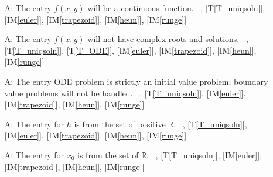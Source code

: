 \documentclass[12pt]{article}
\newcommand{\tref}[1]{T\ref{#1}}
\newcounter{assumpnum} %
\newcommand{\iref}[1]{IM\ref{#1}}
\begin{document}
\begin{itemize}
\item[A\refstepcounter{assumpnum}\theassumpnum \label{A_continuous}:]
The entry $f(x, y)$ will be a continuous function.
~\newline
[\tref{T_ODE}], [\tref{T_uniqsoln}],
[\iref{euler}], [\iref{trapezoid}], [\iref{heun}], [\iref{runge}]

\item[A\refstepcounter{assumpnum}\theassumpnum \label{A_roots}:]
The entry $f(x, y)$ will not have complex roots and solutions.
~\newline
[\tref{T_ODE}], [\tref{T_uniqsoln}],
[\tref{T_ODE}], [\iref{euler}], [\iref{trapezoid}], [\iref{heun}], [\iref{runge}]

\item[A\refstepcounter{assumpnum}\theassumpnum \label{A_boundary}:]
The entry ODE problem is strictly an initial value problem; boundary value problems will
not be handled.
~\newline
[\tref{T_ODE}], [\tref{T_uniqsoln}],
[\iref{euler}], [\iref{trapezoid}], [\iref{heun}], [\iref{runge}]




\item[A\refstepcounter{assumpnum}\theassumpnum \label{A_entriesofh}:]
The entry for $h$ is from the set of positive $\mathbb{R}$.
~\newline
[\tref{T_ODE}], [\tref{T_uniqsoln}],
[\iref{euler}], [\iref{trapezoid}], [\iref{heun}], [\iref{runge}]

\item[A\refstepcounter{assumpnum}\theassumpnum \label{A_entriesofx0}:]
The entry for $x_0$ is from the set of $\mathbb{R}$.
~\newline
[\tref{T_ODE}], [\tref{T_uniqsoln}],
[\iref{euler}], [\iref{trapezoid}], [\iref{heun}], [\iref{runge}]


\end{itemize}
\end{document}

